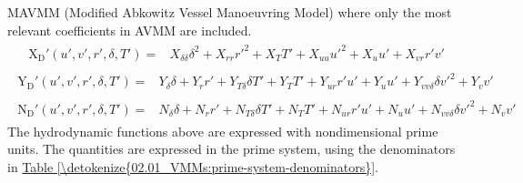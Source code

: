 \documentclass[review]{elsarticle}
\begin{document}
\sphinxAtStartPar
MAVMM (Modified Abkowitz Vessel Manoeuvring Model) where only the most relevant coefficients in AVMM are included.
\begin{equation}\label{equation:02.01_VMMs:eqxmartinssimple}
\begin{split}\begin{split}
\operatorname{X_{D}'}{\left(u',v',r',\delta,T' \right)} = & X_{\delta\delta} \delta^{2} + X_{rr} r'^{2} + X_{T} T' + X_{uu} u'^{2} + X_{u} u' + X_{vr} r' v' 
\end{split}\end{split}
\end{equation}\begin{equation}\label{equation:02.01_VMMs:eqymartinssimple}
\begin{split}\begin{split}
\operatorname{Y_{D}'}{\left(u',v',r',\delta,T' \right)} = & Y_{\delta} \delta + Y_{r} r' + Y_{T\delta} \delta T' + Y_{T} T' + Y_{ur} r' u' + Y_{u} u' + Y_{vv\delta} \delta v'^{2} + Y_{v} v' 
\end{split}\end{split}
\end{equation}\begin{equation}\label{equation:02.01_VMMs:eqnmartinssimple}
\begin{split}\begin{split}
\operatorname{N_{D}'}{\left(u',v',r',\delta,T' \right)} = & N_{\delta} \delta + N_{r} r' + N_{T\delta} \delta T' + N_{T} T' + N_{ur} r' u' + N_{u} u' + N_{vv\delta} \delta v'^{2} + N_{v} v' 
\end{split}\end{split}
\end{equation}
\sphinxAtStartPar
The hydrodynamic functions above are expressed with nondimensional prime units. The quantities are expressed in the prime system, using the denominators in \hyperref[\detokenize{02.01_VMMs:prime-system-denominators}]{Table \ref{\detokenize{02.01_VMMs:prime-system-denominators}}}.
\end{document}
